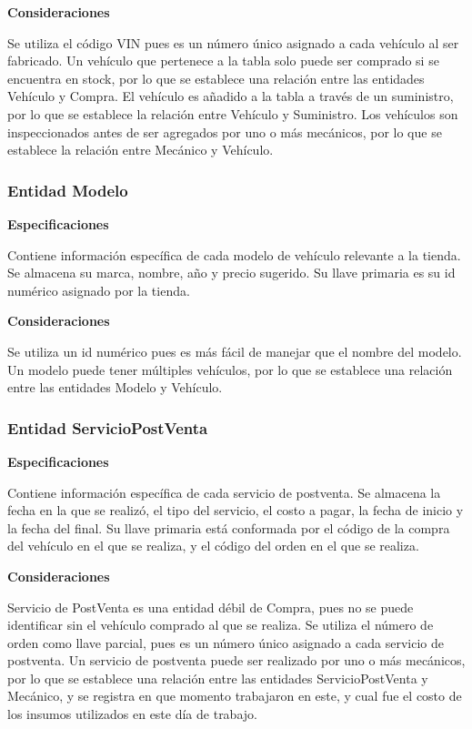\documentclass[12pt]{article}
\begin{document}
\textbf{Consideraciones}

Se utiliza el código VIN pues es un número único asignado a cada vehículo al ser fabricado. Un vehículo que pertenece a la tabla solo puede ser comprado si se encuentra en stock, por lo que se establece una relación entre las entidades Vehículo y Compra. El vehículo es añadido a la tabla a través de un suministro, por lo que se establece la relación entre Vehículo y Suministro. Los vehículos son inspeccionados antes de ser agregados por uno o más mecánicos, por lo que se establece la relación entre Mecánico y Vehículo.


\subsubsection{Entidad Modelo}
\textbf{Especificaciones}

Contiene información específica de cada modelo de vehículo relevante a la tienda. Se almacena su marca, nombre, año y precio sugerido. Su llave primaria es su id numérico asignado por la tienda.

\textbf{Consideraciones}

Se utiliza un id numérico pues es más fácil de manejar que el nombre del modelo. Un modelo puede tener múltiples vehículos, por lo que se establece una relación entre las entidades Modelo y Vehículo.

\subsubsection{Entidad ServicioPostVenta}
\textbf{Especificaciones}

Contiene información específica de cada servicio de postventa. Se almacena la fecha en la que se realizó, el tipo del servicio, el costo a pagar, la fecha de inicio y la fecha del final. Su llave primaria está conformada por el código de la compra del vehículo en el que se realiza, y el código del orden en el que se realiza.

\textbf{Consideraciones}

Servicio de PostVenta es una entidad débil de Compra, pues no se puede identificar sin el vehículo comprado al que se realiza. Se utiliza el número de orden como llave parcial, pues es un número único asignado a cada servicio de postventa. Un servicio de postventa puede ser realizado por uno o más mecánicos, por lo que se establece una relación entre las entidades ServicioPostVenta y Mecánico, y se registra en que momento trabajaron en este, y cual fue el costo de los insumos utilizados en este día de trabajo.
\end{document}
